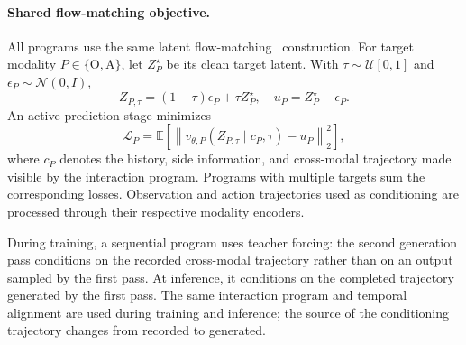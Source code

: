 \paragraph{Shared flow-matching objective.}
All programs use the same latent flow-matching~\cite{lipman2022flow} construction. For target
modality $P\in\{\mathrm O,\mathrm A\}$, let $Z_P^\star$ be its clean target
latent. With $\tau\sim\mathcal U[0,1]$ and
$\epsilon_P\sim\mathcal N(0,I)$,
\begin{equation}
Z_{P,\tau}=(1-\tau)\epsilon_P+\tau Z_P^\star,\quad
u_P=Z_P^\star-\epsilon_P.
\label{eq:flow-path}
\end{equation}
An active prediction stage minimizes
\begin{equation}
\mathcal L_P
=
\mathbb E\!\left[
\left\|
v_{\theta,P}
\!\left(
Z_{P,\tau}\mid c_P,\tau
\right)
-u_P
\right\|_2^2
\right],
\label{eq:shared-flow-objective}
\end{equation}
where $c_P$ denotes the history, side information, and cross-modal
trajectory made visible by the interaction program. Programs with
multiple targets sum the corresponding losses. Observation and
action trajectories used as conditioning are processed through their
respective modality encoders.

During training, a sequential program uses teacher forcing: the second
generation pass conditions on the recorded cross-modal trajectory rather than
on an output sampled by the first pass. At inference, it conditions on the
completed trajectory generated by the first pass. The same interaction program
and temporal alignment are used during training and inference; the source of the conditioning trajectory changes
from recorded to generated. 



